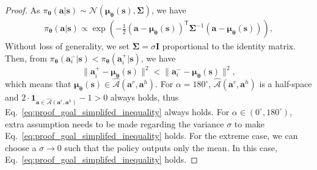 \begin{proof}
    As $\pi_{\bm \theta}(\bm a | \bm s)  \sim\mathcal{N} (\bm \mu_{\bm \theta}(\bm s), \bm \Sigma)$, we have 
\begin{align}
\pi_{\bm \theta}(\bm a | \bm s)  \propto \exp \left( {-\frac{1}{2}( \bm a-\bm \mu_{\bm \theta}(\bm s))^{\mathsf{T}} {\bm \Sigma^{-1}}( \bm a-\bm \mu_{\bm \theta}(\bm s))} \right), 
\label{eq:gaussian}
\end{align}
Without loss of generality, we set $\bm \Sigma = \sigma \bm I$ proportional to the identity matrix. 
Then, from $\pi_{\bm \theta}( \bm a^{-}_i | \bm s) < \pi_{\bm \theta}( \bm a^{+}_i | \bm s)$, we have 
\begin{equation*} 
\| \bm a^{+}_i-\bm  \mu_{\bm \theta}(\bm s) \|^2 < \| \bm a^{-}_i-\bm \mu_{\bm \theta}(\bm s) \|^2,  
\end{equation*}
which means that $\bm \mu_{\bm \theta}(\bm s) \in \hat {\mathcal{A}} {(\bm a^r, \bm a^h)} $. 
For $\alpha = 180^\circ$, $\hat {\mathcal{A}} {(\bm a^r, \bm a^h)}$ is a half-space and $2 \cdot \mathbf{1}_{\bm a \in \hat {\mathcal{A}} {(\bm a^r, \bm a^h)}} - 1 > 0$ always holds, thus Eq.~\eqref{eq:proof_goal_simplifed_inequality} always holds.
For $\alpha \in (0^\circ, 180^\circ)$, extra assumption needs to be made regarding the variance $\sigma$ to make Eq.~\eqref{eq:proof_goal_simplifed_inequality} holds.
For the extreme case, we can choose a $\sigma \rightarrow 0$ such that the policy outputs only the mean. 
In this case, Eq.~\eqref{eq:proof_goal_simplifed_inequality} holds.
\end{proof}

